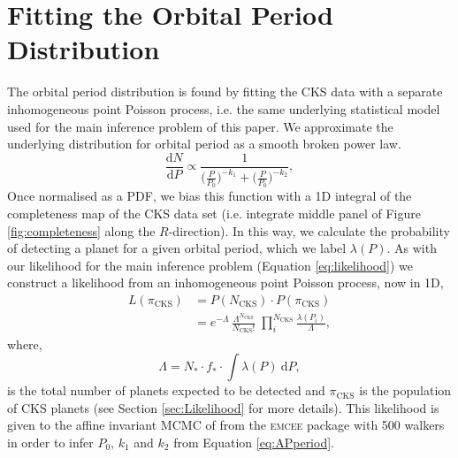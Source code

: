 \documentclass[fleqn,usenatbib]{mnras}
\begin{document}
\section{Fitting the Orbital Period Distribution} \label{sec:PeriodAppendix}
The orbital period distribution is found by fitting the CKS data with a separate inhomogeneous point Poisson process, i.e. the same underlying statistical model used for the main inference problem of this paper. We approximate the underlying distribution for orbital period as a smooth broken power law.
\begin{equation} \label{eq:APperiod}
    \frac{\mathrm{d}N}{\mathrm{d}P} \propto \frac{1}{\big(\frac{P}{P_0}\big)^{-k_1} + \big(\frac{P}{P_0}\big)^{-k_2}},
\end{equation}
Once normalised as a PDF, we bias this function with a 1D integral of the completeness map of the CKS data set (i.e. integrate middle panel of Figure \ref{fig:completeness} along the $R$-direction). In this way, we calculate the probability of detecting a planet for a given orbital period, which we label $\lambda(P)$. As with our likelihood for the main inference problem (Equation \ref{eq:likelihood}) we construct a likelihood from an inhomogeneous point Poisson process, now in 1D,
\begin{equation} \label{eq:Periodlikelihood}
\begin{split}
L(\pi_\text{CKS}) & = P(N_\text{CKS}) \cdot P(\pi_\text{CKS}) \\
 & = e^{-\Lambda} \, \frac{\Lambda^{N_\text{CKS}}}{N_\text{CKS}!} \; \prod_i^{N_\text{CKS}} \frac{\lambda(P_i)}{\Lambda},
\end{split}
\end{equation}
where,
\begin{equation} \label{eq:PeriodLambda}
    \Lambda = N_* \cdot f_* \cdot \int \lambda(P) \: \mathrm{d} P ,
\end{equation}
is the total number of planets expected to be detected and $\pi_\text{CKS}$ is the population of CKS planets (see Section \ref{sec:Likelihood} for more details). This likelihood is given to the affine invariant MCMC of \cite{GoodmanWeare2010} from the \textsc{emcee} package \citep{emcee} with 500 walkers in order to infer $P_0$, $k_1$ and $k_2$ from Equation \ref{eq:APperiod}.
\end{document}
